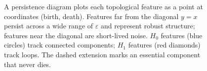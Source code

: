 \begin{figure}[H]
\caption{%
    A persistence diagram plots each topological feature as a point at
    coordinates (birth, death). Features far from the diagonal $y = x$
    persist across a wide range of $\varepsilon$ and represent robust
    structure; features near the diagonal are short-lived noise. $H_0$
    features (blue circles) track connected components; $H_1$ features (red
    diamonds) track loops. The dashed extension marks an essential component
    that never dies.%
}
\label{fig:persistence-diagram}
\end{figure}
